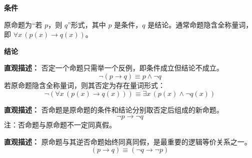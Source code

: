 \begin{statementbox}

	\textbf{\textcolor{CStatement}{条件}}
	\begin{description}[style=nextline, leftmargin=2.8em, labelsep=0.5em, itemsep=0.35em]
		\item[\textbf{\textcolor{CStatement}{条件 1（命题形式）：}}] 原命题为“若 $p$，则 $q$”形式，其中 $p$ 是条件，$q$ 是结论。通常命题隐含全称量词，即 $\forall x\,(p(x)\to q(x))$。
	\end{description}

	\textbf{\textcolor{CStatement}{结论}}
	\begin{description}[style=nextline, leftmargin=2.8em, labelsep=0.5em, itemsep=0.45em]
		\item[\textbf{\textcolor{CStatement}{结论一（命题否定）：}}]
			\textbf{\textcolor{CStatement}{直观描述：}}
			否定一个命题只需举一个反例，即条件成立但结论不成立。
			\[
				\lnot(p\to q)\equiv p\land\lnot q
			\]
			若原命题隐含全称量词，则其否定为存在量词形式：
			\[
				\lnot(\forall x\,(p(x)\to q(x)))\equiv \exists x\,(p(x)\land\lnot q(x))
			\]

		\item[\textbf{\textcolor{CStatement}{结论二（否命题）：}}]
			\textbf{\textcolor{CStatement}{直观描述：}}
			否命题是原命题的条件和结论分别取否定后组成的新命题。
			\[
				\lnot p\to\lnot q
			\]
			注：否命题与原命题不一定同真假。

		\item[\textbf{\textcolor{CStatement}{推广结论（逆否等价）：}}]
			\textbf{\textcolor{CStatement}{直观描述：}}
			原命题与其逆否命题始终同真同假，是最重要的逻辑等价关系之一。
			\[
				(p\to q)\equiv(\lnot q\to\lnot p)
			\]
	\end{description}

\end{statementbox}
